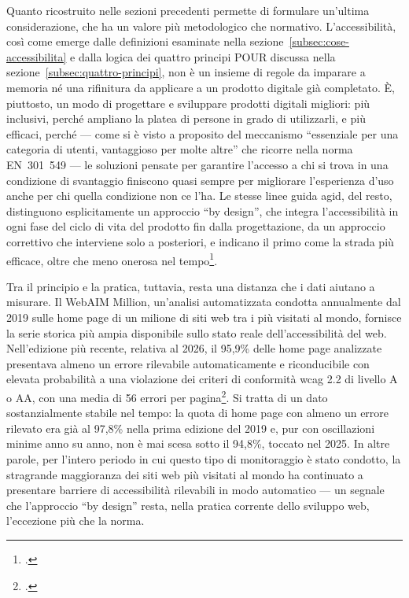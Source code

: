 Quanto ricostruito nelle sezioni precedenti permette di formulare un'ultima considerazione, che ha un valore più metodologico che normativo. L'accessibilità, così come emerge dalle definizioni esaminate nella sezione~\ref{subsec:cose-accessibilita} e dalla logica dei quattro principi POUR discussa nella sezione~\ref{subsec:quattro-principi}, non è un insieme di regole da imparare a memoria né una rifinitura da applicare a un prodotto digitale già completato. È, piuttosto, un modo di progettare e sviluppare prodotti digitali migliori: più inclusivi, perché ampliano la platea di persone in grado di utilizzarli, e più efficaci, perché --- come si è visto a proposito del meccanismo \enquote{essenziale per una categoria di utenti, vantaggioso per molte altre} che ricorre nella norma EN~301~549 --- le soluzioni pensate per garantire l'accesso a chi si trova in una condizione di svantaggio finiscono quasi sempre per migliorare l'esperienza d'uso anche per chi quella condizione non ce l'ha. Le stesse linee guida \gls{agid}, del resto, distinguono esplicitamente un approccio \enquote{by design}, che integra l'accessibilità in ogni fase del ciclo di vita del prodotto fin dalla progettazione, da un approccio correttivo che interviene solo a posteriori, e indicano il primo come la strada più efficace, oltre che meno onerosa nel tempo\footcite[§~6.2]{agid:lg-82-2022}.

Tra il principio e la pratica, tuttavia, resta una distanza che i dati aiutano a misurare. Il WebAIM Million, un'analisi automatizzata condotta annualmente dal 2019 sulle home page di un milione di siti web tra i più visitati al mondo, fornisce la serie storica più ampia disponibile sullo stato reale dell'accessibilità del web. Nell'edizione più recente, relativa al 2026, il 95,9\% delle home page analizzate presentava almeno un errore rilevabile automaticamente e riconducibile con elevata probabilità a una violazione dei criteri di conformità \gls{wcag} 2.2 di livello A o AA, con una media di 56 errori per pagina\footcite{webaim:million2026}. Si tratta di un dato sostanzialmente stabile nel tempo: la quota di home page con almeno un errore rilevato era già al 97,8\% nella prima edizione del 2019 e, pur con oscillazioni minime anno su anno, non è mai scesa sotto il 94,8\%, toccato nel 2025. In altre parole, per l'intero periodo in cui questo tipo di monitoraggio è stato condotto, la stragrande maggioranza dei siti web più visitati al mondo ha continuato a presentare barriere di accessibilità rilevabili in modo automatico --- un segnale che l'approccio \enquote{by design} resta, nella pratica corrente dello sviluppo web, l'eccezione più che la norma.

